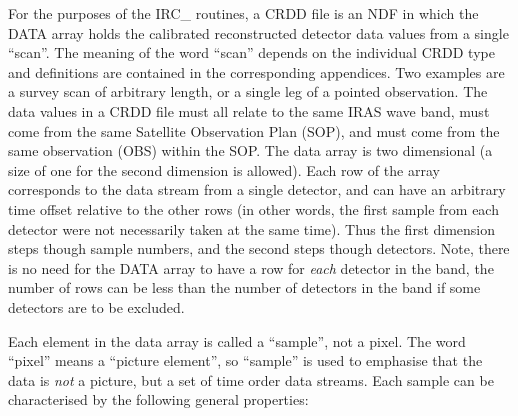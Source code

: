 For the purposes of the IRC\_ routines, a CRDD file is an NDF in which the DATA
array holds the calibrated reconstructed detector data values from a single
``scan''. The meaning of the word ``scan'' depends on the individual CRDD type
and definitions are contained in the corresponding appendices. Two examples are
a survey scan of arbitrary length, or a single leg of a pointed observation. The
data values in a CRDD file must all relate to the same IRAS wave band, must come
from the same Satellite Observation Plan (SOP), and must come from the same
observation (OBS) within the SOP. The data array is two dimensional (a size of
one for the second dimension is allowed). Each row of the array corresponds to
the data stream from a single detector, and can have an arbitrary time offset
relative to the other rows (in other words, the first sample from each detector
were not necessarily taken at the same time). Thus the first dimension steps
though sample numbers, and the second steps though detectors. Note, there is no
need for the DATA array to have a row for {\em each} detector in the band, the
number of rows can be less than the number of detectors in the band if some
detectors are to be excluded. 

Each element in the data array is called a ``sample'', not a pixel. The word
``pixel'' means a ``picture element'', so ``sample'' is used to emphasise that
the data is {\em not} a picture, but a set of time order data streams. Each 
sample can be characterised by the following general properties: 

